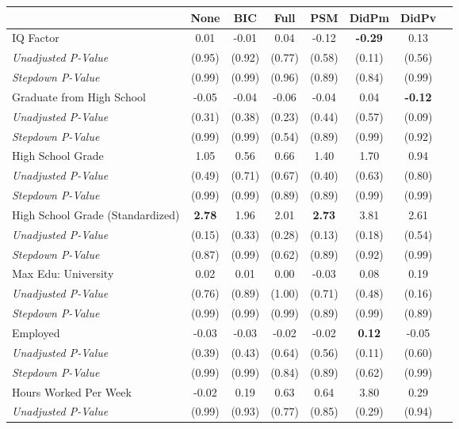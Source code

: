 \begin{tabular}{l c c c c c c c}
\toprule
 & None & BIC & Full & PSM & DidPm & DidPv \\
\midrule
IQ Factor & 0.01 & -0.01 & 0.04 & -0.12 & \textbf{ -0.29 } & 0.13 \\
\quad \textit{Unadjusted P-Value} & (0.95) & (0.92) & (0.77) & (0.58) & (0.11) & (0.56) \\
\quad \textit{Stepdown P-Value} & (0.99) & (0.99) & (0.96) & (0.89) & (0.84) & (0.99) \\
Graduate from High School & -0.05 & -0.04 & -0.06 & -0.04 & 0.04 & \textbf{ -0.12 } \\
\quad \textit{Unadjusted P-Value} & (0.31) & (0.38) & (0.23) & (0.44) & (0.57) & (0.09) \\
\quad \textit{Stepdown P-Value} & (0.99) & (0.99) & (0.54) & (0.89) & (0.99) & (0.92) \\
High School Grade & 1.05 & 0.56 & 0.66 & 1.40 & 1.70 & 0.94 \\
\quad \textit{Unadjusted P-Value} & (0.49) & (0.71) & (0.67) & (0.40) & (0.63) & (0.80) \\
\quad \textit{Stepdown P-Value} & (0.99) & (0.99) & (0.89) & (0.89) & (0.99) & (0.99) \\
High School Grade (Standardized) & \textbf{ 2.78 } & 1.96 & 2.01 & \textbf{ 2.73 } & 3.81 & 2.61 \\
\quad \textit{Unadjusted P-Value} & (0.15) & (0.33) & (0.28) & (0.13) & (0.18) & (0.54) \\
\quad \textit{Stepdown P-Value} & (0.87) & (0.99) & (0.62) & (0.89) & (0.92) & (0.99) \\
Max Edu: University & 0.02 & 0.01 & 0.00 & -0.03 & 0.08 & 0.19 \\
\quad \textit{Unadjusted P-Value} & (0.76) & (0.89) & (1.00) & (0.71) & (0.48) & (0.16) \\
\quad \textit{Stepdown P-Value} & (0.99) & (0.99) & (0.99) & (0.89) & (0.99) & (0.89) \\
Employed & -0.03 & -0.03 & -0.02 & -0.02 & \textbf{ 0.12 } & -0.05 \\
\quad \textit{Unadjusted P-Value} & (0.39) & (0.43) & (0.64) & (0.56) & (0.11) & (0.60) \\
\quad \textit{Stepdown P-Value} & (0.99) & (0.99) & (0.84) & (0.89) & (0.62) & (0.99) \\
Hours Worked Per Week & -0.02 & 0.19 & 0.63 & 0.64 & 3.80 & 0.29 \\
\quad \textit{Unadjusted P-Value} & (0.99) & (0.93) & (0.77) & (0.85) & (0.29) & (0.94) \\

\end{tabular}
